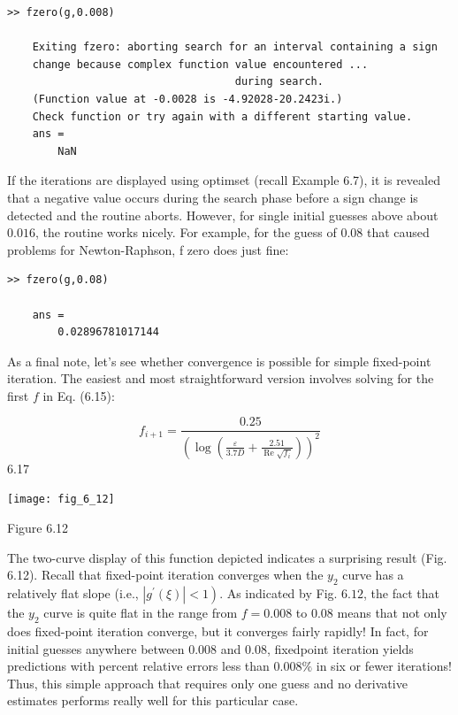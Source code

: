 \documentclass[../main.tex]{subfiles}
\begin{document}
\begin{lstlisting}[numbers=none,frame=none,xleftmargin=-\leftmargini]
    >> fzero(g,0.008)

    Exiting fzero: aborting search for an interval containing a sign
    change because complex function value encountered ...
                                    during search.
    (Function value at -0.0028 is -4.92028-20.2423i.)
    Check function or try again with a different starting value.
    ans =
        NaN
\end{lstlisting}

\noindent If the iterations are displayed using optimset (recall Example 6.7), it is revealed that a negative value occurs during the search phase before a sign change is detected and the routine aborts. However, for single initial guesses above about $0.016$, the routine works nicely. For example, for the guess of $0.08$ that caused problems for Newton-Raphson, f zero does just fine:

\begin{lstlisting}[numbers=none,frame=none,xleftmargin=-\leftmargini]
    >> fzero(g,0.08)

    ans =
        0.02896781017144
\end{lstlisting}

As a final note, let's see whether convergence is possible for simple fixed-point iteration. The easiest and most straightforward version involves solving for the first $f$ in Eq. (6.15):

$$
f_{i+1}=\frac{0.25}{\left(\log \left(\frac{\varepsilon}{3.7 D}+\frac{2.51}{\operatorname{Re} \sqrt{f_{i}}}\right)\right)^{2}}
$$ \hfill{6.17}

\begin{center}
	\texttt{[image: fig\_6\_12]}

	\textsf{Figure 6.12}
\end{center}

The two-curve display of this function depicted indicates a surprising result (Fig. 6.12). Recall that fixed-point iteration converges when the $y_{2}$ curve has a relatively flat slope (i.e., $\left.\left|g^{\prime}(\xi)\right|<1\right)$. As indicated by Fig. $6.12$, the fact that the $y_{2}$ curve is quite flat in the range from $f=0.008$ to $0.08$ means that not only does fixed-point iteration converge, but it converges fairly rapidly! In fact, for initial guesses anywhere between $0.008$ and $0.08$, fixedpoint iteration yields predictions with percent relative errors less than $0.008 \%$ in six or fewer iterations! Thus, this simple approach that requires only one guess and no derivative estimates performs really well for this particular case.
\end{document}
